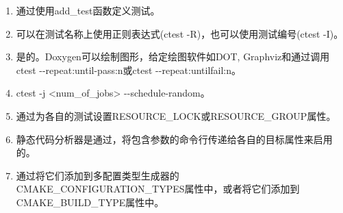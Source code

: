 

\begin{enumerate}
\item 
通过使用add\_test函数定义测试。

\item
可以在测试名称上使用正则表达式(ctest -R)，也可以使用测试编号(ctest -I)。

\item 
是的。Doxygen可以绘制图形，给定绘图软件如DOT, Graphviz和通过调用ctest -{}-repeat:until-pass:n或ctest -{}-repeat:untilfail:n。

\item 
ctest -j <num\_of\_jobs> -{}-schedule-random。

\item 
通过为各自的测试设置RESOURCE\_LOCK或RESOURCE\_GROUP属性。

\item 
静态代码分析器是通过，将包含参数的命令行传递给各自的目标属性来启用的。

\item 
通过将它们添加到多配置类型生成器的CMAKE\_CONFIGURATION\_TYPES属性中，或者将它们添加到CMAKE\_BUILD\_TYPE属性中。
\end{enumerate}